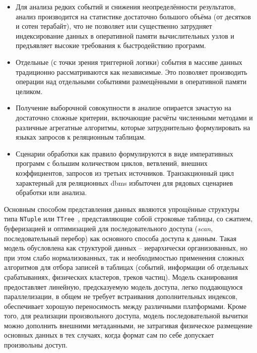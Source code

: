 \begin{itemize}
    \item Для анализа редких событий и снижения неопределённости результатов,
    анализ производится на статистике достаточно большого объёма (от
    десятков и сотен терабайт), что не позволяет или существенно затрудняет
    индексирование данных в оперативной памяти вычислительных узлов и
    предъявляет высокие требования к быстродействию программ.
    \item Отдельные (с точки зрения триггерной логики) события в массиве
    данных традиционно рассматриваются как независимые. Это
    позволяет производить операции над отдельными событиями размещёнными в
    оперативной памяти целиком.
    \item Получение выборочной совокупности в анализе опирается зачастую на
    достаточно сложные критерии, включающие расчёты численными методами и
    различные агрегатные алгоритмы, которые затруднительно формулировать
    на языках запросов к реляционным таблицам.
    \item Сценарии обработки как правило формулируются в виде императивных
    программ с большим количеством циклов, ветвлений, внешних коэффициентов,
    запросов из третьих источников. Транзакционный цикл характерный для
    реляционных \acrshort{dbms} избыточен для рядовых сценариев
    обработки или анализа.
\end{itemize}

Основным способом представления данных являются упрощённые структуры
типа \texttt{NTuple} или \texttt{TTree}~\cite{ROOT-framework}, представляющие
собой строковые таблицы, со сжатием, буферизацией и оптимизацией для
последовательного доступа (\emph{scan}, последовательный перебор) как основного
способа доступа к данным. Такая модель обусловлена
как структурой данных -- иерархически организованных, но при этом слабо
нормализованных, так и необходимостью применения сложных алгоритмов для
отбора записей в таблицах (событий, информации об отдельных срабатываниях,
физических кластеров, треков частиц). Модель сканирования предоставляет
линейную, предсказуемую модель доступа, легко поддающуюся параллелизации,
в общем не требует встраивания дополнительных индексов,
обеспечивает хорошую переносимость между различными платформами. Кроме того,
для реализации произвольного доступа, модель последовательной вычитки можно
дополнить внешними метаданными, не затрагивая физическое размещение
основных данных в тех случаях, когда формат сам по себе допускает произвольны
доступ.

